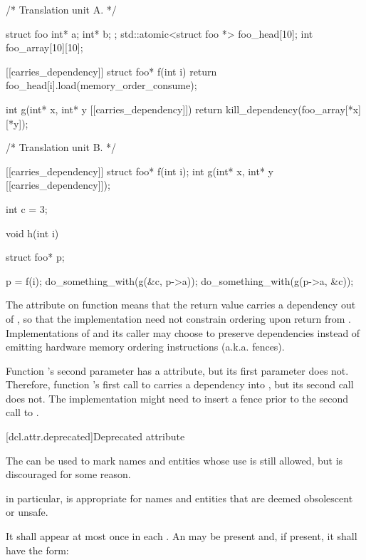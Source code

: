 \pnum
\begin{example}
\begin{codeblock}
/* Translation unit A. */

struct foo { int* a; int* b; };
std::atomic<struct foo *> foo_head[10];
int foo_array[10][10];

[[carries_dependency]] struct foo* f(int i) {
  return foo_head[i].load(memory_order_consume);
}

int g(int* x, int* y [[carries_dependency]]) {
  return kill_dependency(foo_array[*x][*y]);
}

/* Translation unit B. */

[[carries_dependency]] struct foo* f(int i);
int g(int* x, int* y [[carries_dependency]]);

int c = 3;

void h(int i) {
  struct foo* p;

  p = f(i);
  do_something_with(g(&c, p->a));
  do_something_with(g(p->a, &c));
}
\end{codeblock}

\pnum
The  attribute on function  means that the
return value carries a dependency out of , so that the implementation
need not constrain ordering upon return from . Implementations of
 and its caller may choose to preserve dependencies instead of emitting
hardware memory ordering instructions (a.k.a. fences).

\pnum
Function 's second parameter has a  attribute,
but its first parameter does not. Therefore, function 's first call to
 carries a dependency into , but its second call does not. The
implementation might need to insert a fence prior to the second call to
.

\end{example}%
%

[dcl.attr.deprecated]{Deprecated attribute}%

\pnum
The   can be used to mark names and entities
whose use is still allowed, but is discouraged for some reason. \begin{note} in particular,
 is appropriate for names and entities that are deemed obsolescent or
unsafe. \end{note} It shall appear at most once in each . An
 may be present and, if present, it shall have the form:

